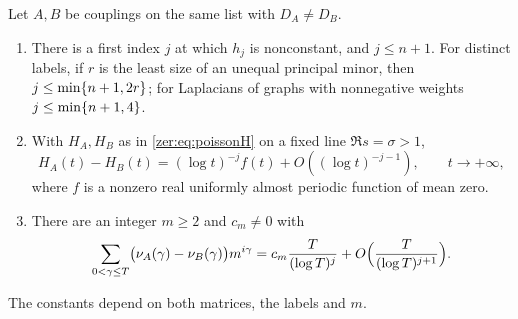 \begin{theorem}\label{zer:thm:couplinggap}
Let $A,B$ be couplings on the same list with $D_A\ne D_B$.
\begin{enumerate}[label=\textup{(\roman*)}]
\item There is a first index $j$ at which $h_j$ is nonconstant, and $j\le n+1$. For distinct labels, if $r$
is the least size of an unequal principal minor, then $j\le\min\{n+1,2r\}$; for Laplacians of graphs with
nonnegative weights $j\le\min\{n+1,4\}$.
\item With $H_A,H_B$ as in \eqref{zer:eq:poissonH} on a fixed line $\Re s=\sigma>1$,
\begin{equation}\label{zer:eq:gapsig}
 H_A(t)-H_B(t)=(\log t)^{-j}f(t)+O((\log t)^{-j-1}),\qquad t\to+\infty,
\end{equation}
where $f$ is a nonzero real uniformly almost periodic function of mean zero.
\item There are an integer $m\ge2$ and $c_m\ne0$ with
\[
 \sum_{0<\gamma\le T}\bigl(\nu_A(\gamma)-\nu_B(\gamma)\bigr)m^{i\gamma}=c_m\frac T{(\log T)^j}+O\Bigl(\frac T{(\log T)^{j+1}}\Bigr).
\]
\end{enumerate}
The constants depend on both matrices, the labels and $m$.
\end{theorem}

